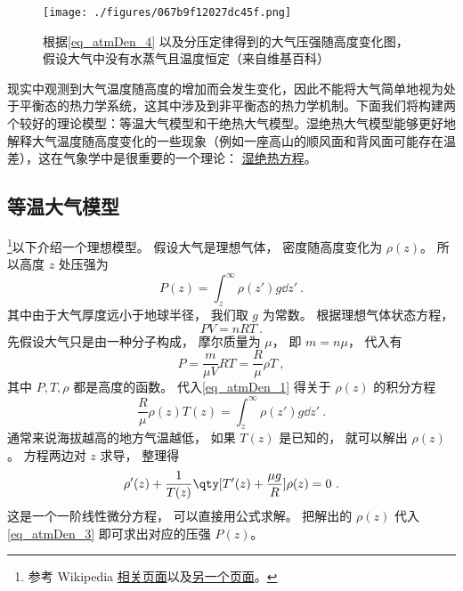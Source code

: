 

\begin{figure}[ht]
\centering
\texttt{[image: ./figures/067b9f12027dc45f.png]}
\caption{根据\autoref{eq_atmDen_4}  以及分压定律得到的大气压强随高度变化图， 假设大气中没有水蒸气且温度恒定（来自维基百科）}\label{fig_atmDen_1}
\end{figure}
现实中观测到大气温度随高度的增加而会发生变化，因此不能将大气简单地视为处于平衡态的热力学系统，这其中涉及到非平衡态的热力学机制。下面我们将构建两个较好的理论模型：等温大气模型和干绝热大气模型。湿绝热大气模型能够更好地解释大气温度随高度变化的一些现象（例如一座高山的顺风面和背风面可能存在温差），这在气象学中是很重要的一个理论：
\href{https://t-inp.readthedocs.io/zh_CN/latest/热力学基础.html}{湿绝热方程}。

\subsection{等温大气模型}
\footnote{参考 Wikipedia \href{https://en.wikipedia.org/wiki/Atmospheric_pressure}{相关页面}以及\href{https://en.wikipedia.org/wiki/International_Standard_Atmosphere}{另一个页面}。}以下介绍一个理想模型。 假设大气是理想气体， 密度随高度变化为 $\rho(z)$。 所以高度 $z$ 处压强为
\begin{equation}\label{eq_atmDen_1}
P(z) = \int_{z}^\infty \rho(z') g \dd{z'}~.
\end{equation}
其中由于大气厚度远小于地球半径， 我们取 $g$ 为常数。 根据理想气体状态方程，
\begin{equation}
PV = n R T~.
\end{equation}
先假设大气只是由一种分子构成， 摩尔质量为 $\mu$， 即 $m = n\mu$， 代入有
\begin{equation}\label{eq_atmDen_3}
P = \frac{m}{\mu V} RT = \frac{R}{\mu} \rho T~,
\end{equation}
其中 $P, T, \rho$ 都是高度的函数。 代入\autoref{eq_atmDen_1} 得关于 $\rho(z)$ 的积分方程 %
\begin{equation}
\frac{R}{\mu} \rho(z) T(z) = \int_{z}^\infty \rho(z') g \dd{z'}~.
\end{equation}
通常来说海拔越高的地方气温越低， 如果 $T(z)$ 是已知的， 就可以解出 $\rho(z)$。 方程两边对 $z$ 求导， 整理得
\begin{equation}\label{eq_atmDen_5}
\rho'(z)  +  \frac{1}{T(z)}\qty[T'(z) + \frac{\mu g}{R}]\rho(z) = 0~.
\end{equation}
这是一个一阶线性微分方程， 可以直接用公式求解。 把解出的 $\rho(z)$ 代入\autoref{eq_atmDen_3} 即可求出对应的压强 $P(z)$。

